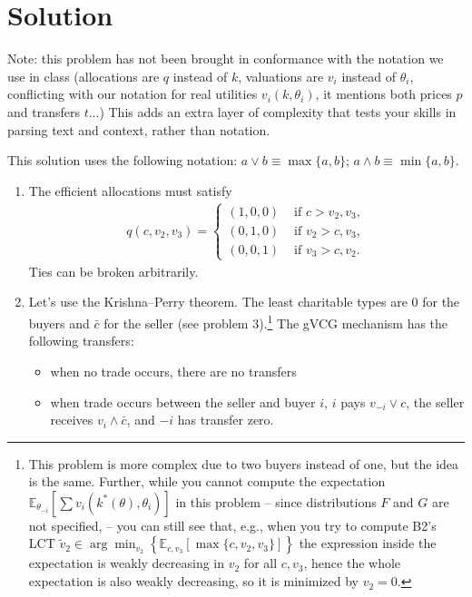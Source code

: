 \documentclass[a4paper]{article}
\newif\ifsolutions
\begin{document}
	
\ifsolutions
\section*{Solution}
	Note: this problem has not been brought in conformance with the notation we use in class (allocations are $q$ instead of $k$, valuations are $v_i$ instead of $\theta_i$, conflicting with our notation for real utilities $v_i(k,\theta_i)$, it mentions both prices $p$ and transfers $t$...) This adds an extra layer of complexity that tests your skills in parsing text and context, rather than notation.

	This solution uses the following notation: $a \vee b \equiv \max\{a,b\}$; $a \wedge b \equiv \min \{a,b\}$.
	\begin{enumerate}%
		\item The efficient allocations must satisfy
		\begin{align*}
			q(c, v_2, v_3) = 
			\begin{cases}
				(1,0,0) &\text{ if } c > v_2, v_3, \\
				(0,1,0) &\text{ if } v_2 > c,v_3, \\
				(0,0,1) &\text{ if } v_3 > c,v_2.
			\end{cases}
		\end{align*}
		Ties can be broken arbitrarily.
		
		\item Let's use the Krishna--Perry theorem. The least charitable types are $0$ for the buyers and $\bar{c}$ for the seller (see problem 3).\footnote{This problem is more complex due to two buyers instead of one, but the idea is the same. Further, while you cannot compute the expectation $\mathbb{E}_{\theta_{-i}} [\sum v_i(k^*(\theta),\theta_i)]$ in this problem -- since distributions $F$ and $G$ are not specified, -- you can still see that, e.g., when you try to compute B2's LCT $\tilde{v}_2 \in \arg \min_{v_2} \left\{ \mathbb{E}_{c,v_3} \left[ \max\{c,v_2,v_3\} \right] \right\}$ the expression inside the expectation is weakly decreasing in $v_2$ for all $c,v_3$, hence the whole expectation is also weakly decreasing, so it is minimized by $v_2 = 0$.} 
		The gVCG mechanism has the following transfers:
		\begin{itemize}
			
			\item when no trade occurs, there are no transfers
			
			\item when trade occurs between the seller and buyer $i$, $i$ pays $v_{-i} \vee c$, the seller receives $v_i \wedge \bar{c}$, and $-i$ has transfer zero.
			

\end{itemize}
\end{enumerate}
\end{document}

